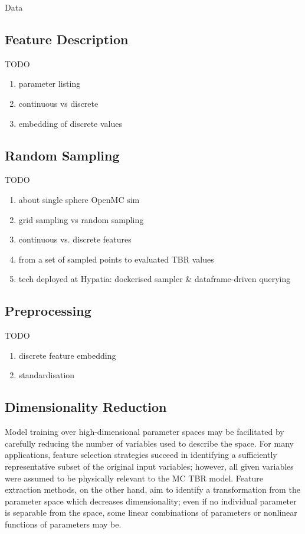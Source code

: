 Data

\subsection{Feature Description}
\label{sec:feature-description}

TODO
\begin{enumerate}
	\item parameter listing
	\item continuous vs discrete
	\item embedding of discrete values
\end{enumerate}


\subsection{Random Sampling}
\label{sec:sampling}

TODO
\begin{enumerate}
	\item about single sphere OpenMC sim
	\item grid sampling vs random sampling
	\item continuous vs. discrete features
	\item from a set of sampled points to evaluated TBR values
	\item tech deployed at Hypatia: dockerised sampler \& dataframe-driven querying
\end{enumerate}


\subsection{Preprocessing}
\label{sec:preprocessing}

TODO
\begin{enumerate}
	\item discrete feature embedding
	\item standardisation
\end{enumerate}


\subsection{Dimensionality Reduction}
\label{sec:dimred}

Model training over high-dimensional parameter spaces may be facilitated by carefully reducing the number of variables used to describe the space. For many applications, feature selection strategies succeed in identifying a sufficiently representative subset of the original input variables; however, all given variables were assumed to be physically relevant to the MC TBR model. Feature extraction methods, on the other hand, aim to identify a transformation from the parameter space which decreases dimensionality; even if no individual parameter is separable from the space, some linear combinations of parameters or nonlinear functions of parameters may be.

